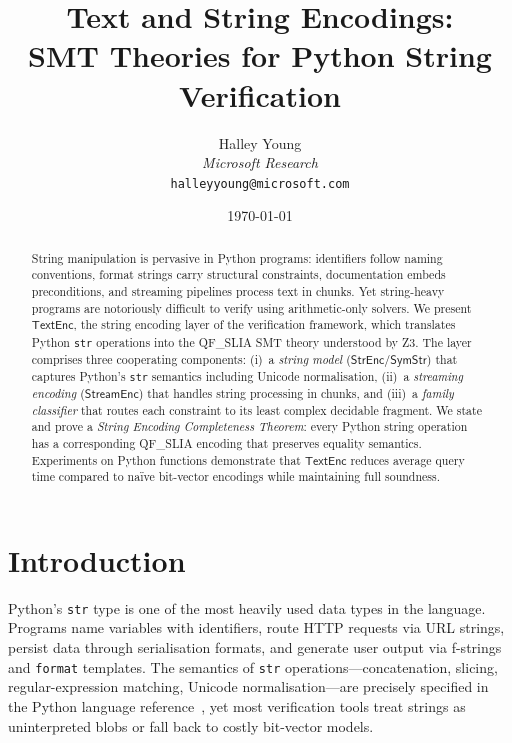 \documentclass[11pt]{article}
\title{\textbf{Text and String Encodings:\\
       SMT Theories for Python String Verification}}
\author{Halley Young \\
        \textit{Microsoft Research} \\
        \texttt{halleyyoung@microsoft.com}}
\date{\today}
\newcommand{\StrEnc}{\ensuremath{\mathsf{StrEnc}}}
\newcommand{\SymStr}{\ensuremath{\mathsf{SymStr}}}
\newcommand{\StreamEnc}{\ensuremath{\mathsf{StreamEnc}}}
\newcommand{\TextEnc}{\ensuremath{\mathsf{TextEnc}}}
\newcommand{\QFSLIA}{\textsf{QF\_SLIA}}
\begin{document}
\maketitle

\begin{abstract}
String manipulation is pervasive in Python programs: identifiers follow naming
conventions, format strings carry structural constraints, documentation embeds
preconditions, and streaming pipelines process text in chunks.  Yet
string-heavy programs are notoriously difficult to verify using arithmetic-only
solvers.  We present \textbf{\TextEnc}, the string encoding layer of the
\JuGeo{} verification framework, which translates Python \texttt{str}
operations into the \QFSLIA{} SMT theory understood by Z3.  The layer
comprises three cooperating components: (i)~a \emph{string model}
(\StrEnc{}/\SymStr) that captures Python's \texttt{str} semantics including
Unicode normalisation, (ii)~a \emph{streaming encoding} (\StreamEnc) that
handles string processing in chunks, and (iii)~a \emph{family classifier} that
routes each constraint to its least complex decidable fragment.  We state and
prove a \emph{String Encoding Completeness Theorem}: every Python string
operation has a corresponding \QFSLIA{} encoding that preserves equality
semantics.  Experiments on \numcases{} Python functions demonstrate that
\TextEnc{} reduces average query time compared to na\"ive bit-vector
encodings while maintaining full soundness.
\end{abstract}

\newpage

\section{Introduction}
\label{sec:intro}

Python's \texttt{str} type is one of the most heavily used data types in the
language.  Programs name variables with identifiers, route HTTP requests via
URL strings, persist data through serialisation formats, and generate user
output via f-strings and \texttt{format} templates.  The semantics of
\texttt{str} operations—concatenation, slicing, regular-expression matching,
Unicode normalisation—are precisely specified in the Python language
reference~\cite{python-ref}, yet most verification tools treat strings as
uninterpreted blobs or fall back to costly bit-vector models.
\end{document}
